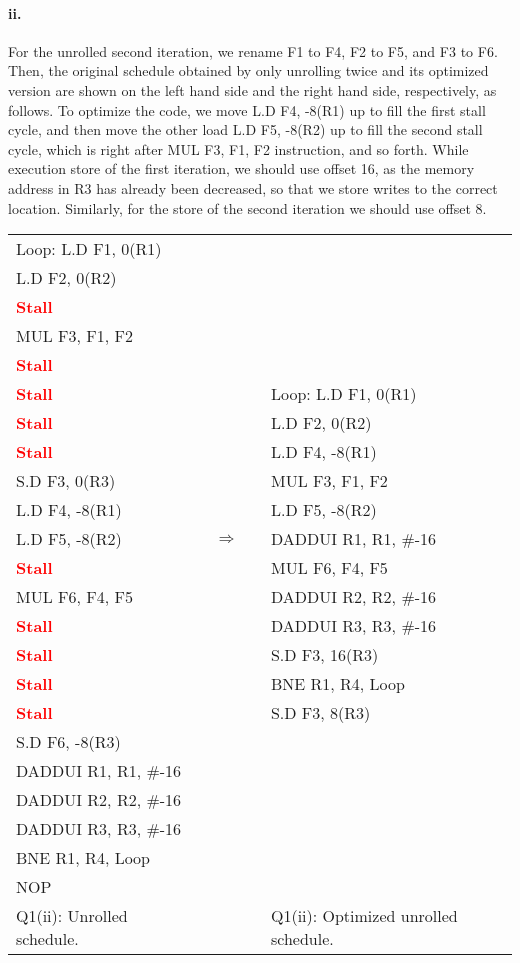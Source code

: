 \documentclass[11pt]{article}
\renewcommand{\part}[1]{\paragraph*{{#1}.}}
\newcommand{\code}[1]{\textsf{#1}}
\newcommand{\stall}{\textcolor{red}{\textbf{Stall}}}
\begin{document}
\part{ii} 
For the unrolled second iteration, we rename \code{F1} to \code{F4}, \code{F2} to \code{F5}, and \code{F3} to \code{F6}. Then, the original schedule obtained by only unrolling twice and its optimized version are shown on the left hand side and the right hand side, respectively, as follows. To optimize the code, we move \code{L.D F4, -8(R1)} up to fill the first stall cycle, and then move the other load \code{L.D F5, -8(R2)} up to fill the second stall cycle, which is right after \code{MUL F3, F1, F2} instruction, and so forth. While execution store of the first iteration, we should use offset 16, as the memory address in \code{R3} has already been decreased, so that we store writes to the correct location. Similarly, for the store of the second iteration we should use offset 8.

\begin{table}[h]
\center
\small
\begin{tabular}{lcccl}
	  \code{Loop:} \code{L.D F1, 0(R1)} & & & &  \\
	 \code{L.D F2, 0(R2)} & & & &  \\
	 \stall & & & &   \\
	 \code{MUL F3, F1, F2} & & & &  \\
	 \stall & & & &  \\
	 \stall & & & &  \code{Loop:} \code{L.D F1, 0(R1)}  \\
	 \stall & & & &  \code{L.D F2, 0(R2)} \\
	 \stall & & & & \code{L.D F4, -8(R1)}  \\
	 \code{S.D F3, 0(R3)} & & & & \code{MUL F3, F1, F2}  \\
	 \code{L.D F4, -8(R1)} & & & &  \code{L.D F5, -8(R2)}  \\
	 \code{L.D F5, -8(R2)} & & $\Rightarrow$ & & \code{DADDUI R1, R1, \#-16} \\
	 \stall & & & &  \code{MUL F6, F4, F5} \\
	 \code{MUL F6, F4, F5} & & & & \code{DADDUI R2, R2, \#-16}  \\
	 \stall & & & &  \code{DADDUI R3, R3, \#-16} \\
	 \stall  & & & & \code{S.D F3, 16(R3)} \\
	 \stall & & & & \code{BNE R1, R4, Loop}  \\
	 \stall & & & & \code{S.D F3, 8(R3)}  \\	 
	 \code{S.D F6, -8(R3)} & & & &  \\
	 \code{DADDUI R1, R1, \#-16} & & & &  \\
	 \code{DADDUI R2, R2, \#-16} & & & &  \\
	 \code{DADDUI R3, R3, \#-16} & & & &  \\
	 \code{BNE R1, R4, Loop} & & & &  \\
	 \code{NOP} & & & & \\
	 Q1(ii): Unrolled schedule. & & & & Q1(ii): Optimized unrolled schedule.
\end{tabular}
\label{tbl:q1p2}
\end{table}
\end{document}
